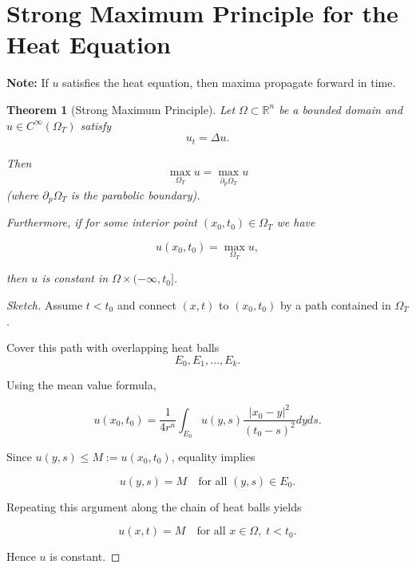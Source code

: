 \documentclass{article}
\newtheorem{theorem}{Theorem}[section]
\begin{document}
\section*{Strong Maximum Principle for the Heat Equation}

\textbf{Note:} If $u$ satisfies the heat equation, then maxima propagate forward in time.

\begin{theorem}[Strong Maximum Principle]
Let $\Omega \subset \mathbb{R}^n$ be a bounded domain and $u\in C^\infty(\Omega_T)$ satisfy
\[
u_t = \Delta u .
\]

Then
\[
\max_{\Omega_T} u = \max_{\partial_p \Omega_T} u
\]
(where $\partial_p\Omega_T$ is the parabolic boundary).

Furthermore, if for some interior point $(x_0,t_0)\in\Omega_T$ we have

\[
u(x_0,t_0) = \max_{\Omega_T} u,
\]

then $u$ is constant in $\Omega \times (-\infty,t_0]$.
\end{theorem}

\begin{proof}[Sketch]

Assume $t<t_0$ and connect $(x,t)$ to $(x_0,t_0)$ by a path contained in $\Omega_T$.

Cover this path with overlapping heat balls
\[
E_0, E_1, \dots , E_k .
\]

Using the mean value formula,

\[
u(x_0,t_0)
=
\frac{1}{4r^n}
\int_{E_0}
u(y,s)\frac{|x_0-y|^2}{(t_0-s)^2} dy ds .
\]

Since $u(y,s) \le M := u(x_0,t_0)$, equality implies

\[
u(y,s) = M \quad \text{for all } (y,s)\in E_0.
\]

Repeating this argument along the chain of heat balls yields

\[
u(x,t)=M
\quad
\text{for all } x\in\Omega, \; t<t_0 .
\]

Hence $u$ is constant.

\end{proof}
\end{document}
